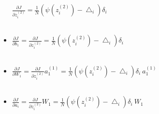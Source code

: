 \documentclass[
	12pt, %
]{fphw}
\begin{document}
\begin{itemize}
$\frac {\partial J}{\partial z_{i}^{(2)}} = \frac{1}{N} (\psi(z_{i}^{(2)}) - \bigtriangleup_i) \delta_i$ \\ \\

\item $\frac {\partial J}{\partial b_1} = \frac {\partial J}{\partial z_{i}^{(2)}} = \frac{1}{N} (\psi(z_{i}^{(2)}) - \bigtriangleup_i) \delta_i$ \\ \\

\item $\frac {\partial J}{\partial W_1} = \frac {\partial J}{\partial z_{i}^{(2)}} a_{1}^{(1)} = \frac{1}{N} (\psi(z_{i}^{(2)}) - \bigtriangleup_i) \delta_i \ a_{1}^{(1)}$ \\ \\

\item $\frac {\partial J}{\partial a_i} = \frac {\partial J}{\partial z_{i}^{(2)}} W_1 = \frac{1}{N} (\psi(z_{i}^{(2)}) - \bigtriangleup_i) \delta_i \ W_1$

\end{itemize}


















\end{document}
